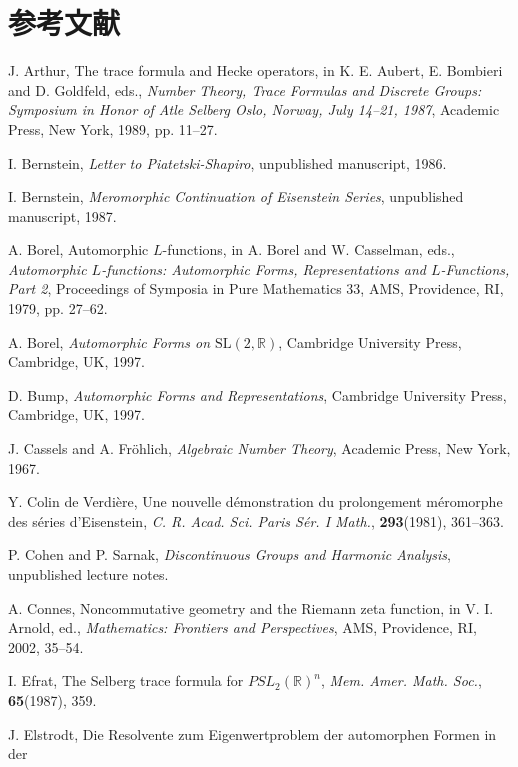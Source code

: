 \section*{参考文献}

\begin{enumerate}[label={[\arabic*]},leftmargin=2.8em,itemsep=0.35em,topsep=0.4em]
\item J. Arthur, The trace formula and Hecke operators, in K. E. Aubert, E. Bombieri
and D. Goldfeld, eds., \emph{Number Theory, Trace Formulas and Discrete Groups:
Symposium in Honor of Atle Selberg Oslo, Norway, July 14--21, 1987}, Academic Press,
New York, 1989, pp. 11--27.
\item I. Bernstein, \emph{Letter to Piatetski-Shapiro}, unpublished manuscript, 1986.
\item I. Bernstein, \emph{Meromorphic Continuation of Eisenstein Series},
unpublished manuscript, 1987.
\item A. Borel, Automorphic $L$-functions, in A. Borel and W. Casselman, eds.,
\emph{Automorphic $L$-functions: Automorphic Forms, Representations and
$L$-Functions, Part 2}, Proceedings of Symposia in Pure Mathematics 33, AMS,
Providence, RI, 1979, pp. 27--62.
\item A. Borel, \emph{Automorphic Forms on $\mathrm{SL}(2,\mathbb{R})$},
Cambridge University Press, Cambridge, UK, 1997.
\item D. Bump, \emph{Automorphic Forms and Representations}, Cambridge University
Press, Cambridge, UK, 1997.
\item J. Cassels and A. Fr\"ohlich, \emph{Algebraic Number Theory}, Academic Press,
New York, 1967.
\item Y. Colin de Verdi\`ere, Une nouvelle d\'emonstration du prolongement
m\'eromorphe des s\'eries d'Eisenstein, \emph{C. R. Acad. Sci. Paris S\'er. I Math.},
\textbf{293}(1981), 361--363.
\item P. Cohen and P. Sarnak, \emph{Discontinuous Groups and Harmonic Analysis},
unpublished lecture notes.
\item A. Connes, Noncommutative geometry and the Riemann zeta function, in
V. I. Arnold, ed., \emph{Mathematics: Frontiers and Perspectives}, AMS,
Providence, RI, 2002, 35--54.
\item I. Efrat, The Selberg trace formula for $PSL_{2}(\mathbb{R})^{n}$,
\emph{Mem. Amer. Math. Soc.}, \textbf{65}(1987), 359.
\item J. Elstrodt, Die Resolvente zum Eigenwertproblem der automorphen Formen in der

\end{enumerate}
